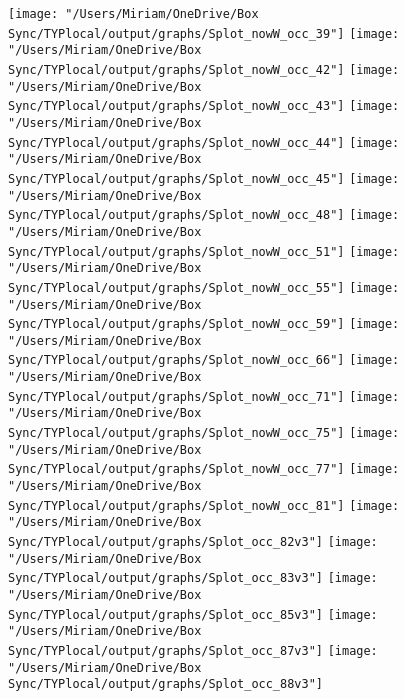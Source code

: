 \documentclass[11pt]{article}
\begin{document}
\newline
\texttt{[image: "/Users/Miriam/OneDrive/Box Sync/TYPlocal/output/graphs/Splot\_nowW\_occ\_39"]}
\newline
\texttt{[image: "/Users/Miriam/OneDrive/Box Sync/TYPlocal/output/graphs/Splot\_nowW\_occ\_42"]}
\newline
\texttt{[image: "/Users/Miriam/OneDrive/Box Sync/TYPlocal/output/graphs/Splot\_nowW\_occ\_43"]}
\newline
\texttt{[image: "/Users/Miriam/OneDrive/Box Sync/TYPlocal/output/graphs/Splot\_nowW\_occ\_44"]}
\newline
\texttt{[image: "/Users/Miriam/OneDrive/Box Sync/TYPlocal/output/graphs/Splot\_nowW\_occ\_45"]}
\newline
\texttt{[image: "/Users/Miriam/OneDrive/Box Sync/TYPlocal/output/graphs/Splot\_nowW\_occ\_48"]}
\newline
\texttt{[image: "/Users/Miriam/OneDrive/Box Sync/TYPlocal/output/graphs/Splot\_nowW\_occ\_51"]}
\newline
\texttt{[image: "/Users/Miriam/OneDrive/Box Sync/TYPlocal/output/graphs/Splot\_nowW\_occ\_55"]}
\newline
\texttt{[image: "/Users/Miriam/OneDrive/Box Sync/TYPlocal/output/graphs/Splot\_nowW\_occ\_59"]}
\newline
\texttt{[image: "/Users/Miriam/OneDrive/Box Sync/TYPlocal/output/graphs/Splot\_nowW\_occ\_66"]}
\newline
\texttt{[image: "/Users/Miriam/OneDrive/Box Sync/TYPlocal/output/graphs/Splot\_nowW\_occ\_71"]}
\newline
\texttt{[image: "/Users/Miriam/OneDrive/Box Sync/TYPlocal/output/graphs/Splot\_nowW\_occ\_75"]}
\newline
\texttt{[image: "/Users/Miriam/OneDrive/Box Sync/TYPlocal/output/graphs/Splot\_nowW\_occ\_77"]}
\newline
\texttt{[image: "/Users/Miriam/OneDrive/Box Sync/TYPlocal/output/graphs/Splot\_nowW\_occ\_81"]}
\newline
\texttt{[image: "/Users/Miriam/OneDrive/Box Sync/TYPlocal/output/graphs/Splot\_occ\_82v3"]}
\newline
\texttt{[image: "/Users/Miriam/OneDrive/Box Sync/TYPlocal/output/graphs/Splot\_occ\_83v3"]}
\newline
\texttt{[image: "/Users/Miriam/OneDrive/Box Sync/TYPlocal/output/graphs/Splot\_occ\_85v3"]}
\newline
\texttt{[image: "/Users/Miriam/OneDrive/Box Sync/TYPlocal/output/graphs/Splot\_occ\_87v3"]}
\newline
\texttt{[image: "/Users/Miriam/OneDrive/Box Sync/TYPlocal/output/graphs/Splot\_occ\_88v3"]}
\newline
\end{document}
